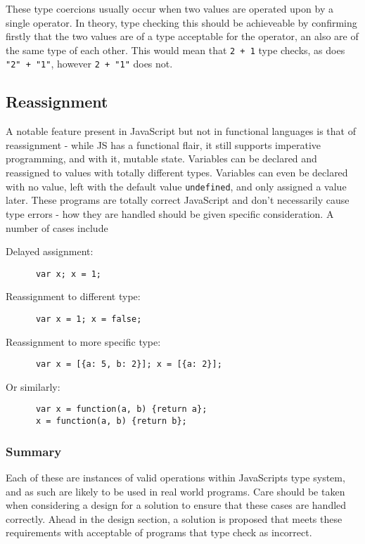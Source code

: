 \documentclass[british, twoside]{bhamthesis}
\theoremstyle{definition}
\begin{document}
    These type coercions usually occur when two values are operated upon by a single operator. In theory, type checking this should be achieveable by confirming firstly that the two values are of a type acceptable for the operator, an also are of the same type of each other. This would mean that \texttt{2 + 1} type checks, as does \texttt{"2" + "1"}, however \texttt{2 + "1"} does not.

  \subsection{Reassignment}

    A notable feature present in JavaScript but not in functional languages is that of reassignment - while JS has a functional flair, it still supports imperative programming, and with it, mutable state. Variables can be declared and reassigned to values with totally different types. Variables can even be declared with no value, left with the default value \texttt{undefined}, and only assigned a value later. These programs are totally correct JavaScript and don't necessarily cause type errors - how they are handled should be given specific consideration. A number of cases include

    Delayed assignment:
    \begin{lstlisting}
      var x; x = 1;
    \end{lstlisting}

    Reassignment to different type:
    \begin{lstlisting}
      var x = 1; x = false;
    \end{lstlisting}

    Reassignment to more specific type:
    \begin{lstlisting}
      var x = [{a: 5, b: 2}]; x = [{a: 2}];
    \end{lstlisting}

    Or similarly:
    \begin{lstlisting}
      var x = function(a, b) {return a};
      x = function(a, b) {return b};
    \end{lstlisting}

  \subsubsection{Summary}

    Each of these are instances of valid operations within JavaScripts type system, and as such are likely to be used in real world programs. Care should be taken when considering a design for a solution to ensure that these cases are handled correctly. Ahead in the design section, a solution is proposed that meets these requirements with acceptable of programs that type check as incorrect.
\end{document}
